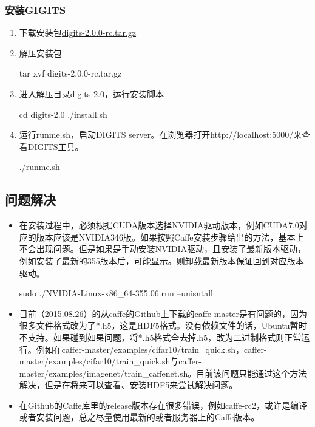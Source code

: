 \subsubsection{安装GIGITS}
\begin{enumerate}
\item 下载安装包\href{https://developer.nvidia.com/digits}{digits-2.0.0-rc.tar.gz}
\item 解压安装包
\begin{bash}
tar xvf digits-2.0.0-rc.tar.gz
\end{bash}
\item 进入解压目录digits-2.0，运行安装脚本
\begin{bash}
cd digits-2.0
./install.sh
\end{bash}
\item 运行runme.sh，启动DIGITS server。在浏览器打开http://localhost:5000/来查看DIGITS工具。
\begin{bash}
./runme.sh
\end{bash}
\end{enumerate}

\subsection{问题解决}
\begin{itemize}
\item 在安装过程中，必须根据CUDA版本选择NVIDIA驱动版本，例如CUDA7.0对应的版本应该是NVIDIA346版。如果按照Caffe安装步骤给出的方法，基本上不会出现问题。但是如果是手动安装NVIDIA驱动，且安装了最新版本驱动，例如安装了最新的355版本后，可能显示{\color{blue}{no CUDA-capable device is detected}}。则卸载最新版本保证回到对应版本驱动。
\begin{bash}
sudo ./NVIDIA-Linux-x86_64-355.06.run --unisntall
\end{bash}
\item 目前（2015.08.26）的从caffe的Github上下载的caffe-master是有问题的，因为很多文件格式改为了*.h5，这是HDF5格式。没有依赖文件的话，Ubuntu暂时不支持。如果碰到如果问题，将*.h5格式全去掉.h5，改为二进制格式则正常运行。例如在caffer-master/examples/cifar10/train\_quick.sh，caffer-master/examples/cifar10/train\_quick.sh与caffer-master/examples/imagenet/train\_caffenet.sh。目前该问题只能通过这个方法解决，但是在将来可以查看、安装\href{https://github.com/live-clones/hdf5}{HDF5}来尝试解决问题。
\item 在Github的Caffe库里的release版本存在很多错误，例如caffe-rc2，或许是编译或者安装问题，总之尽量使用最新的或者服务器上的Caffe版本。
\end{itemize}

